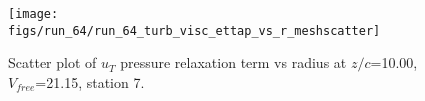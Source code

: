 \begin{figure}[H]
\centering
\texttt{[image: figs/run\_64/run\_64\_turb\_visc\_ettap\_vs\_r\_meshscatter]}
\caption{Scatter plot of $
u_T$ pressure relaxation term vs radius at $z/c$=10.00, $V_{free}$=21.15, station 7.}
\end{figure}



